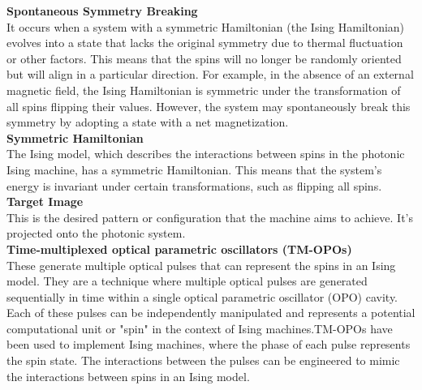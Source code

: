 \textbf{Spontaneous Symmetry Breaking}\\
It occurs when a system with a symmetric Hamiltonian (the Ising Hamiltonian) evolves into a state that lacks the original symmetry due to thermal fluctuation or other factors. This means that the spins will no longer be randomly oriented but will align in a particular direction. For example, in the absence of an external magnetic field, the Ising Hamiltonian is symmetric under the transformation of all spins flipping their values. However, the system may spontaneously break this symmetry by adopting a state with a net magnetization.\\

\textbf{Symmetric Hamiltonian} \\
The Ising model, which describes the interactions between spins in the photonic Ising machine, has a symmetric Hamiltonian. This means that the system's energy is invariant under certain transformations, such as flipping all spins.\\

\textbf{Target Image} \\
This is the desired pattern or configuration that the machine aims to achieve. It's projected onto the photonic system. \\

\textbf{Time-multiplexed optical parametric oscillators (TM-OPOs)} \\

These generate multiple optical pulses that can represent the spins in an Ising model. They are a technique where multiple optical pulses are generated sequentially in time within a single optical parametric oscillator (OPO) cavity. Each of these pulses can be independently manipulated and represents a potential computational unit or "spin" in the context of Ising machines.TM-OPOs have been used to implement Ising machines, where the phase of each pulse represents the spin state. The interactions between the pulses can be engineered to mimic the interactions between spins in an Ising model.\\

